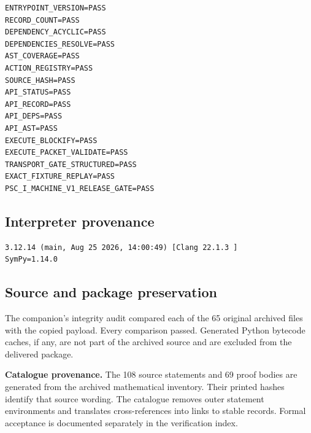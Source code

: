 \documentclass[a4paper,11pt]{article}
\begin{document}
\begin{lstlisting}
ENTRYPOINT_VERSION=PASS
RECORD_COUNT=PASS
DEPENDENCY_ACYCLIC=PASS
DEPENDENCIES_RESOLVE=PASS
AST_COVERAGE=PASS
ACTION_REGISTRY=PASS
SOURCE_HASH=PASS
API_STATUS=PASS
API_RECORD=PASS
API_DEPS=PASS
API_AST=PASS
EXECUTE_BLOCKIFY=PASS
EXECUTE_PACKET_VALIDATE=PASS
TRANSPORT_GATE_STRUCTURED=PASS
EXACT_FIXTURE_REPLAY=PASS
PSC_I_MACHINE_V1_RELEASE_GATE=PASS

\end{lstlisting}
\subsection*{Interpreter provenance}

\begin{lstlisting}
3.12.14 (main, Aug 25 2026, 14:00:49) [Clang 22.1.3 ]
SymPy=1.14.0

\end{lstlisting}
\subsection*{Source and package preservation}
The companion's integrity audit compared each of the 65 original archived files with the copied payload. Every comparison passed. Generated Python bytecode caches, if any, are not part of the archived source and are excluded from the delivered package.

\textbf{Catalogue provenance.} The 108 source statements and 69 proof bodies are generated from the archived mathematical inventory. Their printed hashes identify that source wording. The catalogue removes outer statement environments and translates cross-references into links to stable records. Formal acceptance is documented separately in the verification index.
\end{document}
